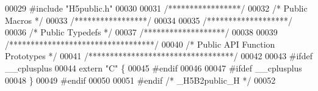 \begin{DoxyCode}
00029 \textcolor{preprocessor}{#include "H5public.h"}
00030 
00031 \textcolor{comment}{/*****************/}
00032 \textcolor{comment}{/* Public Macros */}
00033 \textcolor{comment}{/*****************/}
00034 
00035 \textcolor{comment}{/*******************/}
00036 \textcolor{comment}{/* Public Typedefs */}
00037 \textcolor{comment}{/*******************/}
00038 
00039 \textcolor{comment}{/**********************************/}
00040 \textcolor{comment}{/* Public API Function Prototypes */}
00041 \textcolor{comment}{/**********************************/}
00042 
00043 \textcolor{preprocessor}{#ifdef \_\_cplusplus}
00044 \textcolor{keyword}{extern} \textcolor{stringliteral}{"C"} \{
00045 \textcolor{preprocessor}{#endif}
00046 
00047 \textcolor{preprocessor}{#ifdef \_\_cplusplus}
00048 \}
00049 \textcolor{preprocessor}{#endif}
00050 
00051 \textcolor{preprocessor}{#endif }\textcolor{comment}{/* \_H5B2public\_H */}\textcolor{preprocessor}{}
00052 
\end{DoxyCode}
